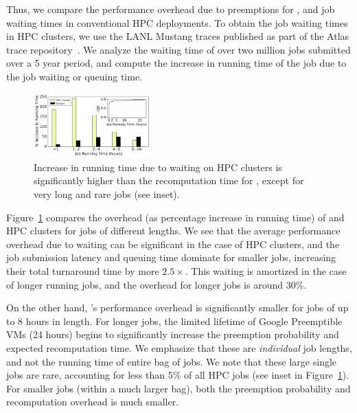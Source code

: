 Thus, we compare the performance overhead due to preemptions for \sysname, and job waiting times in conventional HPC deployments.
To obtain the job waiting times in HPC clusters, we use the LANL Mustang traces published as part of the Atlas trace repository~\cite{cmu-atlas}.
We analyze the waiting time of over two million jobs submitted over a 5 year period, and compute the increase in running time of the job due to the job waiting or queuing time. 

\begin{figure}[t]
  \centering 
  \includegraphics[width=0.4\textwidth]{../graphs/hpc-vs-scispot.pdf}
      \vspace*{\myfigspace}
  \caption{Increase in running time due to waiting on HPC clusters is significantly higher than the recomputation time for \sysname, except for very long and rare jobs (see inset). }
  \label{fig:hpc-vs-scispot}
  \vspace*{\myfigspace}
\end{figure}


Figure~\ref{fig:hpc-vs-scispot} compares the overhead (as percentage increase in running time) of \sysname and HPC clusters  for jobs of different lengths. We see that the average performance overhead due to waiting can be significant in the case of HPC clusters, and the job submission latency and queuing time dominate for smaller jobs, increasing their total turnaround time by more $2.5\times$.
This waiting is amortized in the case of longer running jobs, and the overhead for longer jobs is around 30\%.

On the other hand, \sysname's performance overhead is significantly smaller for jobs of up to 8 hours in length.
For longer jobs, the limited lifetime of Google Preemptible VMs (24 hours) begins to significantly increase the preemption probability and expected recomputation time.
We emphasize that these are \emph{individual} job lengths, and not the running time of entire bag of jobs.
We note that these large single jobs are rare, accounting for less than 5\% of all HPC jobs (see inset in Figure~\ref{fig:hpc-vs-scispot}).
For smaller jobs (within a much larger bag), both the preemption probability and recomputation overhead is much smaller. 

